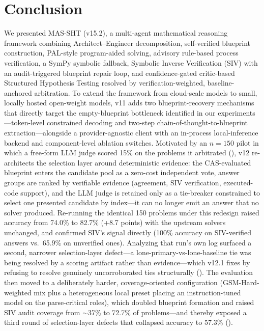\documentclass[11pt,a4paper]{article}
\begin{document}
\section{Conclusion}
\label{sec:conclusion}
We presented MAS-SHT (v15.2), a multi-agent mathematical reasoning framework combining Architect--Engineer decomposition, self-verified blueprint construction, PAL-style program-aided solving, advisory rule-based process verification, a SymPy symbolic fallback, Symbolic Inverse Verification (SIV) with an audit-triggered blueprint repair loop, and confidence-gated critic-based Structured Hypothesis Testing resolved by verification-weighted, baseline-anchored arbitration.
To extend the framework from cloud-scale models to small, locally hosted open-weight models, v11 adds two blueprint-recovery mechanisms that directly target the empty-blueprint bottleneck identified in our experiments---token-level constrained decoding and two-step chain-of-thought-to-blueprint extraction---alongside a provider-agnostic client with an in-process local-inference backend and component-level ablation switches.
Motivated by an $n{=}150$ pilot in which a free-form LLM judge scored 15\% on the problems it arbitrated (), v12 re-architects the selection layer around deterministic evidence: the CAS-evaluated blueprint enters the candidate pool as a zero-cost independent vote, answer groups are ranked by verifiable evidence (agreement, SIV verification, executed-code support), and the LLM judge is retained only as a tie-breaker constrained to select one presented candidate by index---it can no longer emit an answer that no solver produced.
Re-running the identical 150 problems under this redesign raised accuracy from 74.0\% to 82.7\% (+8.7 points) with the upstream solvers unchanged, and confirmed SIV's signal directly (100\% accuracy on SIV-verified answers vs.\ 65.9\% on unverified ones).
Analyzing that run's own log surfaced a second, narrower selection-layer defect---a lone-primary-vs-lone-baseline tie was being resolved by a scoring artifact rather than evidence---which v12.1 fixes by refusing to resolve genuinely uncorroborated ties structurally ().
The evaluation then moved to a deliberately harder, coverage-oriented configuration (GSM-Hard-weighted mix plus a heterogeneous local preset placing an instruction-tuned model on the parse-critical roles), which doubled blueprint formation and raised SIV audit coverage from $\sim$37\% to 72.7\% of problems---and thereby exposed a third round of selection-layer defects that collapsed accuracy to 57.3\% ().
\end{document}
